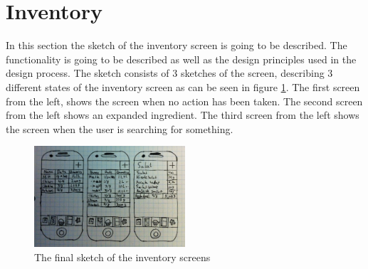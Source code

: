\section{Inventory}

In this section the sketch of the inventory screen is going to be described. The functionality is going to be described as well as the design principles used in the design process. The sketch consists of 3 sketches of the screen, describing 3 different states of the inventory screen as can be seen in figure \ref{FinalInventorySketch}. The first screen from the left, shows the screen when no action has been taken. The second screen from the left shows an expanded ingredient. The third screen from the left shows the screen when the user is searching for something.

\begin{figure}[H]
    \centering
    \includegraphics[width=0.5\textwidth]{Grafik/FoodPlanner/FinalInventorySketch}
    \caption{The final sketch of the inventory screens}
    \label{FinalInventorySketch}
\end{figure}